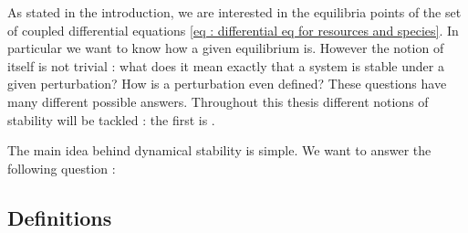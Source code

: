 \documentclass[12pt, titlepage]{report}
\begin{document}
As stated in the introduction, we are interested in the equilibria points of the set of coupled differential equations \eqref{eq : differential eq for resources and species}. In particular we want to know how  a given equilibrium is. However the notion of  itself is not trivial : what does it mean exactly that a system is stable under a given perturbation? How is a perturbation even defined? These questions have many different possible answers. Throughout this thesis different notions of stability will be tackled : the first is .

The main idea behind dynamical stability is simple. We want to answer the following question :

\begin{centering}
\end{centering}
\subsection{Definitions}
\end{document}
